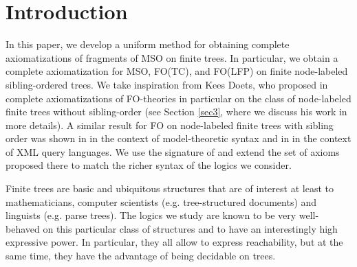 \documentclass{LMCS}
\newcommand{\xml}{\textsf{XML}\xspace}
\newcommand{\fo}{\textsf{FO}\xspace}
\newcommand{\mso}{\textsf{MSO}\xspace}
\newcommand{\fotc}{\textsf{FO(TC)}\xspace}
\newcommand{\folfp}{\textsf{FO(LFP)}\xspace}
\begin{document}
\section{Introduction}



In this paper, we develop a uniform method for obtaining
complete axiomatizations of fragments of \mso on finite trees. In
particular, we obtain a complete axiomatization for \mso, \fotc,
and \folfp on finite node-labeled sibling-ordered trees. We take
inspiration from Kees Doets, who proposed in \cite{1987}
complete axiomatizations of \fo-theories in particular on the class of
node-labeled finite trees without sibling-order  
(see Section \ref{sec3}, where we discuss his work in more details). A similar result
for \fo on node-labeled finite trees with sibling order was
shown in \cite{1995} in the context of model-theoretic syntax
and in \cite{07} in the context of \xml query languages. We use the signature of \cite{07}
and extend the set of axioms proposed there to match the richer syntax of the logics we consider.

Finite trees are basic and ubiquitous structures that are of
interest at least to mathematicians, computer scientists
(e.g. tree-structured documents) and linguists (e.g. parse trees). The
logics we study are known to be very well-behaved on this
particular class of structures and to have an interestingly high
expressive power. In particular, they all allow to express
reachability, but at the same time, they have the advantage of
being decidable on trees.
\end{document}
